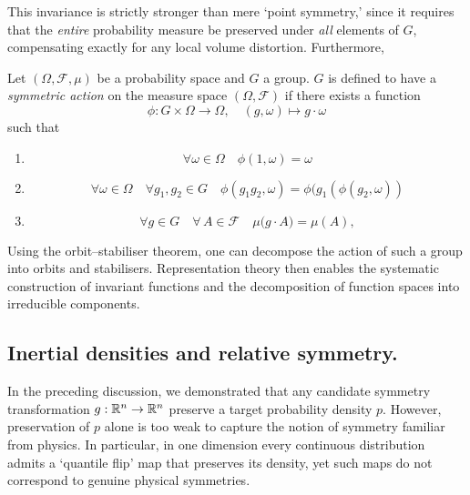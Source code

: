 This invariance is strictly stronger than mere `point symmetry,' since it requires that the \emph{entire} probability measure be preserved under \emph{all} elements of $G$, compensating exactly for any local volume distortion. Furthermore,

\begin{definition}
Let $(\Omega,\mathcal{F},\mu)$ be a probability space and $G$ a group.  \(G\) is defined to have a \emph{symmetric action} on the measure space $(\Omega,\mathcal{F})$ if there exists a function
\[
    \phi: G \times \Omega \to\Omega,\quad (g,\omega)\mapsto g\cdot\omega
\]
such that
\begin{enumerate}
  \item \[\forall\omega \in\Omega\quad\phi(1, \omega) = \omega\]
  \item \[\forall\omega\in\Omega\quad\forall g_1, g_2\in G\quad \phi(g_1g_2, \omega) = \phi(g_1 (\phi (g_2, \omega))\]
  \item 
\[
    \forall g\in G\quad\forall\,A\in\mathcal{F}\quad\mu\bigl(g\cdot A\bigr)=\mu(A),
\]
\end{enumerate}
\end{definition}
        
        Using the orbit--stabiliser theorem, one can decompose the action of such a group into orbits and stabilisers.
        Representation theory then enables the systematic construction of invariant functions and the decomposition of function spaces into irreducible components.
        
\subsection{Inertial densities and relative symmetry.}
\label{subsec:inertial_densities}
    In the preceding discussion, we demonstrated that any candidate symmetry transformation $g : \mathbb{R}^n \to \mathbb{R}^n$ preserve a target probability density $p$.  However, preservation of $p$ alone is too weak to capture the notion of symmetry familiar from physics.  In particular, in one dimension every continuous distribution admits a `quantile flip' map that preserves its density, yet such maps do not correspond to genuine physical symmetries.
